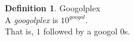 \documentclass[10pt]{article}
\theoremstyle{definition}
\newtheorem*{defn}{Definition}
\begin{document}
\begin{defn}{Googolplex \\}
A \textit{googolplex} is $10^{googol}$. \\
That is, $1$ followed by a googol $0$s.
\end{defn}
\end{document}
